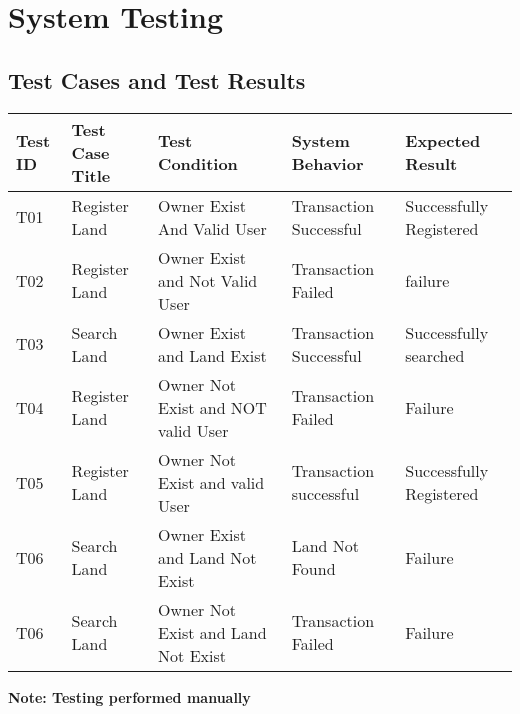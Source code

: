 \chapter{System Testing}
\paragraph{}
\section{Test Cases and Test Results}
\begin{longtable}{ | p{1cm} | p{3.5cm} | p{4cm} | p{4cm} | p{4cm} |}
      \hline
      \textbf{Test ID} & \textbf{Test Case Title} & \textbf{Test Condition} & \textbf{System Behavior} & \textbf{Expected Result}\\
      \hline
      T01 & Register Land & Owner Exist And Valid User & Transaction Successful & Successfully  Registered\\
      \hline
       T02 & Register Land & Owner Exist and Not Valid User & Transaction Failed& failure\\
      \hline T03 & Search Land & Owner Exist and Land Exist & Transaction Successful & Successfully searched\\
      \hline
       T04& Register Land & Owner Not Exist and NOT valid User& Transaction Failed & Failure \\
      \hline
       T05& Register Land & Owner Not Exist and valid User& Transaction successful & Successfully Registered \\
      \hline
       T06& Search Land & Owner Exist and Land Not Exist&Land Not Found& Failure \\
      \hline 
      T06& Search Land & Owner Not Exist and Land Not Exist&Transaction Failed& Failure \\
      \hline 
\end{longtable}

\textbf{Note: Testing performed manually}